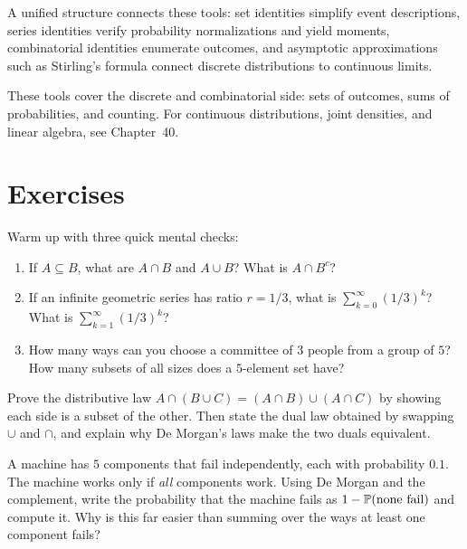 \begin{aestheticbox}
A unified structure connects these tools: set identities simplify event
descriptions, series identities verify probability normalizations and yield
moments, combinatorial identities enumerate outcomes, and asymptotic
approximations such as Stirling's formula connect discrete distributions to
continuous limits.
\end{aestheticbox}

These tools cover the discrete and combinatorial side: sets of outcomes,
sums of probabilities, and counting. For continuous distributions, joint
densities, and linear algebra, see Chapter~40.

\section{Exercises}
\label{ch39:exercises}

\begin{exercise}
\label{ch39:ex-warmup}
Warm up with three quick mental checks:
\begin{enumerate}
  \item If $A \subseteq B$, what are $A \cap B$ and $A \cup B$? What is $A \cap B^c$?
  \item If an infinite geometric series has ratio $r = 1/3$, what is $\sum_{k=0}^\infty (1/3)^k$? What is $\sum_{k=1}^\infty (1/3)^k$?
  \item How many ways can you choose a committee of $3$ people from a group of $5$? How many subsets of all sizes does a $5$-element set have?
\end{enumerate}
\end{exercise}

\begin{exercise}
Prove the distributive law $A \cap (B \cup C) = (A \cap B) \cup (A \cap C)$ by
showing each side is a subset of the other. Then state the dual law obtained
by swapping $\cup$ and $\cap$, and explain why De Morgan's laws make the two
duals equivalent.
\end{exercise}

\begin{exercise}
A machine has $5$ components that fail independently, each with probability
$0.1$. The machine works only if \emph{all} components work. Using De Morgan
and the complement, write the probability that the machine fails as
$1 - \P(\text{none fail})$ and compute it. Why is this far easier than summing
over the ways at least one component fails?
\end{exercise}


